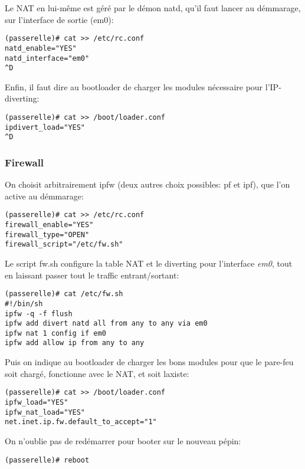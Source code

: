 Le NAT en lui-même est géré par le démon natd, qu'il faut lancer
au démmarage, sur l'interface de sortie (em$0$):
\begin{verbatim}
(passerelle)# cat >> /etc/rc.conf
natd_enable="YES"
natd_interface="em0"
^D
\end{verbatim}

Enfin, il faut dire au bootloader de charger les modules nécessaire
pour l'IP-diverting:
\begin{verbatim}
(passerelle)# cat >> /boot/loader.conf
ipdivert_load="YES"
^D
\end{verbatim}

\subsubsection{Firewall}
On choisit arbitrairement ipfw (deux autres choix possibles: pf et ipf),
que l'on active au démmarage:
\begin{verbatim}
(passerelle)# cat >> /etc/rc.conf
firewall_enable="YES"
firewall_type="OPEN"
firewall_script="/etc/fw.sh"
\end{verbatim}

Le script fw.sh configure la table NAT et le diverting pour l'interface
\textit{em0}, tout en laissant passer tout le traffic entrant/sortant:
\begin{verbatim}
(passerelle)# cat /etc/fw.sh 
#!/bin/sh
ipfw -q -f flush
ipfw add divert natd all from any to any via em0
ipfw nat 1 config if em0
ipfw add allow ip from any to any
\end{verbatim}

Puis on indique au bootloader de charger les bons modules pour que
le pare-feu soit chargé, fonctionne avec le NAT, et soit laxiste:
\begin{verbatim}
(passerelle)# cat >> /boot/loader.conf
ipfw_load="YES"
ipfw_nat_load="YES"
net.inet.ip.fw.default_to_accept="1"
\end{verbatim}

On n'oublie pas de redémarrer pour booter sur le nouveau pépin:
\begin{verbatim}
(passerelle)# reboot
\end{verbatim}

